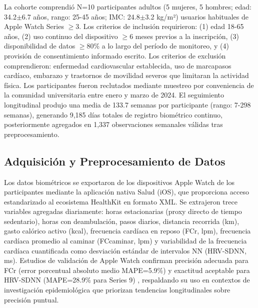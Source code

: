 \documentclass[journal,twoside,web]{ieeecolor}
\begin{document}
La cohorte comprendió N=10 participantes adultos (5 mujeres, 5 hombres; edad: 34.2$\pm$6.7 años, rango: 25-45 años; IMC: 24.8$\pm$3.2 kg/m²) usuarios habituales de Apple Watch Series $\geq$3. Los criterios de inclusión requirieron: (1) edad 18-65 años, (2) uso continuo del dispositivo $\geq$6 meses previos a la inscripción, (3) disponibilidad de datos $\geq$80\% a lo largo del período de monitoreo, y (4) provisión de consentimiento informado escrito. Los criterios de exclusión comprendieron: enfermedad cardiovascular establecida, uso de marcapasos cardíaco, embarazo y trastornos de movilidad severos que limitaran la actividad física. Los participantes fueron reclutados mediante muestreo por conveniencia de la comunidad universitaria entre enero y marzo de 2024. El seguimiento longitudinal produjo una media de 133.7 semanas por participante (rango: 7-298 semanas), generando 9,185 días totales de registro biométrico continuo, posteriormente agregados en 1,337 observaciones semanales válidas tras preprocesamiento.

\subsection{Adquisición y Preprocesamiento de Datos}
\label{subsec:adquisicion}

Los datos biométricos se exportaron de los dispositivos Apple Watch de los participantes mediante la aplicación nativa Salud (iOS), que proporciona acceso estandarizado al ecosistema HealthKit en formato XML. Se extrajeron trece variables agregadas diariamente: horas estacionarias (proxy directo de tiempo sedentario), horas con deambulación, pasos diarios, distancia recorrida (km), gasto calórico activo (kcal), frecuencia cardíaca en reposo (FCr, lpm), frecuencia cardíaca promedio al caminar (FCcaminar, lpm) y variabilidad de la frecuencia cardíaca cuantificada como desviación estándar de intervalos NN (HRV-SDNN, ms). Estudios de validación de Apple Watch confirman precisión adecuada para FCr (error porcentual absoluto medio MAPE=5.9\%) y exactitud aceptable para HRV-SDNN (MAPE=28.9\% para Series 9) \cite{OGrady2024AppleWatch,Khushhal2025AppleCardiac}, respaldando su uso en contextos de investigación epidemiológica que priorizan tendencias longitudinales sobre precisión puntual.
\end{document}
